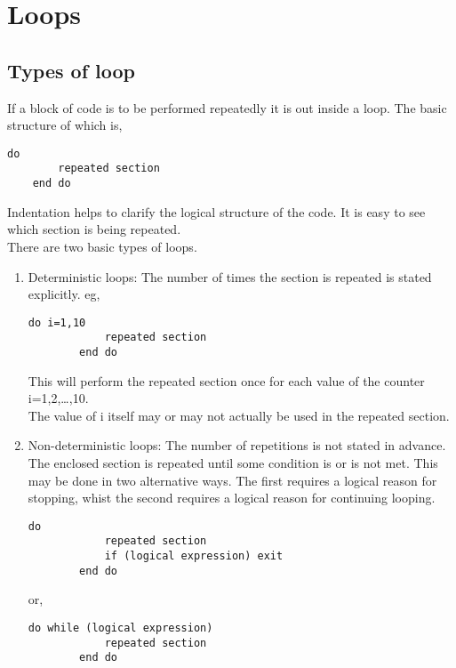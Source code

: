 \documentclass[class=book,crop=false]{standalone}
\begin{document}
\chapter{Loops}
\section{Types of  loop}
If a block of code is to be performed repeatedly it is out inside a  loop. The basic structure of which is,
\begin{lstlisting}[numbers=none]
    do
        repeated section
    end do
\end{lstlisting}
Indentation helps to clarify the logical structure of the code. It is easy to see which section is being repeated.\\

There are two basic types of  loops.
\begin{enumerate}[label=(\alph*)]
    \item Deterministic  loops: The number of times the section is repeated is stated explicitly. eg,
    \begin{lstlisting}[numbers=none]
        do i=1,10
            repeated section
        end do
    \end{lstlisting}
    This will perform the repeated section once for each value of the counter i=1,2,\dots,10.\\
    The value of i itself may or may not actually be used in the repeated section.
    \item Non-deterministic  loops: The number of repetitions is not stated in advance.
    The enclosed section is repeated until some condition is or is not met.
    This may be done in two alternative ways. 
    The first requires a logical reason for stopping, whist the second requires a logical reason for continuing looping.
    \begin{lstlisting}[numbers=none]
        do
            repeated section
            if (logical expression) exit
        end do
    \end{lstlisting}
    or,
    \begin{lstlisting}[numbers=none]
        do while (logical expression)
            repeated section
        end do
    \end{lstlisting}
\end{enumerate}
\end{document}
